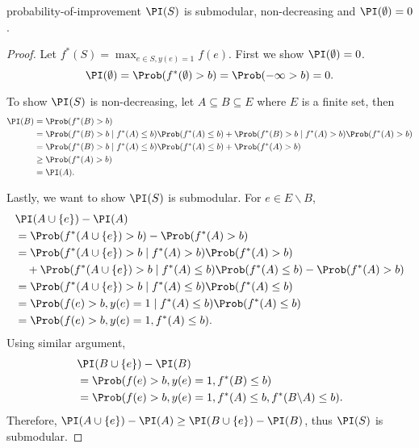 \begin{lemma} \label{lemma:2}
  probability-of-improvement $\PI(S)$ is submodular, non-decreasing and $\PI(\emptyset)=0$.
\end{lemma}
\begin{proof}
Let $f^*(S) = \max_{e \in S, y(e)=1} f(e)$. First we show $\PI(\emptyset) = 0$.
\begin{equation*}
  \PI(\emptyset) = \Prob(f^*(\emptyset) > b) = \Prob(-\infty > b)=0.
\end{equation*}

To show $\PI(S)$ is non-decreasing, let $A \subseteq B \subseteq E$ where $E$ is a finite set, then
\begin{equation*}
\begin{split}
\PI(B) &= \Prob(f^*(B) > b) \\
       &= \Prob(f^*(B) > b \mid f^*(A) \leq b) \Prob(f^*(A) \leq b) + \Prob(f^*(B) > b \mid f^*(A) > b) \Prob(f^*(A) > b) \\
       &= \Prob(f^*(B) > b \mid f^*(A) \leq b) \Prob(f^*(A) \leq b) + \Prob(f^*(A) > b) \\
       &\geq \Prob(f^*(A) > b) \\
       &= \PI(A).
\end{split}
\end{equation*}

Lastly, we want to show $\PI(S)$ is submodular. For $e \in E\backslash B$,
\begin{equation*}
  \begin{split}
    &\PI(A \cup \{e\}) - \PI(A) \\
    &= \Prob(f^*(A \cup \{e\}) > b) - \Prob(f^*(A) > b) \\
    &= \Prob(f^*(A \cup \{e\}) > b \mid f^*(A) > b) \Prob(f^*(A) > b) \\
    &\quad + \Prob(f^*(A \cup \{e\}) > b \mid f^*(A) \leq b)
    \Prob(f^*(A) \leq b) - \Prob(f^*(A) > b) \\
    &= \Prob(f^*(A \cup \{e\}) > b \mid f^*(A)\leq b) \Prob(f^*(A)\leq b) \\
    &= \Prob(f(e) > b, y(e) = 1 \mid f^*(A) \leq b) \Prob(f^*(A) \leq b) \\
    &= \Prob(f(e) > b, y(e) = 1, f^*(A) \leq b).
  \end{split}
\end{equation*}
Using similar argument,
\begin{equation*}
\begin{split}
&\PI(B \cup \{e\}) - \PI(B) \\
&= \Prob(f(e) > b, y(e)=1,f^*(B)\leq b) \\
&= \Prob(f(e) > b, y(e)=1,f^*(A)\leq b, f^*(B\backslash A) \leq b ).
\end{split}
\end{equation*}
Therefore, $\PI(A \cup \{e\}) - \PI(A) \geq \PI(B \cup \{e\}) - \PI(B)$, thus $\PI(S)$ is submodular. \qedhere
\end{proof}

